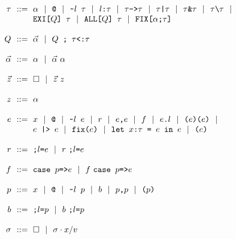 \documentclass[acmsmall]{acmart}
\theoremstyle{definition}
\begin{document}
\begin{figure*}[h]
\[
\begin{array}[t]{r@{}l}
\nonterm{\tau} & \is 
  \begin{array}[t]{@{}l}
  \code{$\alpha$} \sep 
  \code{@} \sep
  \code{\textasciitilde{}$l$ $\tau$} \sep 
  \code{$l$:$\tau$} \sep 
  \code{$\tau$->$\tau$} \sep
  \code{$\tau$|$\tau$} \sep
  \code{$\tau$\&$\tau$} \sep
  \code{$\tau$\textbackslash$\tau$} \sep 
  \\
  \code{EXI[$Q$] $\tau$} \sep 
  \code{ALL[$Q$] $\tau$} \sep 
  \code{FIX[$\alpha$;$\tau$]}
  \end{array}
\\
\\
\nonterm{Q} & \is
  \vec{\alpha} \sep 
  \code{$Q$ ; $\tau$<:$\tau$} 
\\
\\
\nonterm{\vec{\alpha}} & \is \alpha \sep \vec{\alpha}\ \alpha 
\\
\\
\nonterm{\vec{z}} & \is \square \sep \vec{z}\ z
\\
\\
\nonterm{z} & \is \alpha 
\\
\\
\nonterm{e} & \is 
  \begin{array}[t]{@{}l}
  \code{$x$} \sep 
  \code{@} \sep
  \code{\textasciitilde{}$l$ $e$} \sep 
  r \sep
  \code{$e$,$e$} \sep
  f \sep 
  \code{$e$.$l$} \sep
  \code{($e$)($e$)} \sep
  \\
  \code{$e$ |> $e$} \sep
  \code{fix($e$)} \sep
  \code{let $x$:$\tau$ = $e$ in $e$} \sep
  \code{($e$)}
  \end{array}
\\
\\
\nonterm{r} & \is 
  \code{;$l$=$e$} \sep r\ \code{;$l$=$e$}
\\
\\
\nonterm{f} & \is 
  \code{case $p$=>$e$} \sep f\ \code{case $p$=>$e$}
\\
\\
\nonterm{p} & \is 
  \code{$x$} \sep
  \code{@} \sep
  \code{\textasciitilde{}$l$ $p$} \sep
  b \sep
  \code{$p$,$p$} \sep
  \code{($p$)} 
\\
\\
\nonterm{b} & \is 
  \code{;$l$=$p$} \sep b\ \code{;$l$=$p$}
\\
\\
\nonterm{\sigma} & \is 
  \square \sep \sigma \cdot x \slash v
\\
\\

\end{array}\]
\end{figure*}
\end{document}

